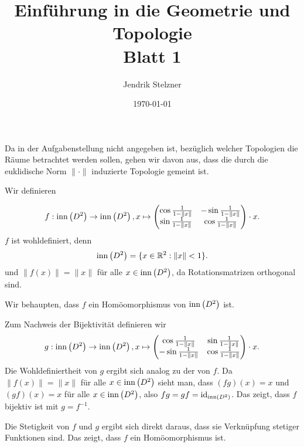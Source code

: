 \documentclass[a4paper,10pt]{article}
\title{\sc Einführung in die Geometrie und Topologie \\ \Large Blatt 1}
\author{Jendrik Stelzner}
\date{\today}
\begin{document}
\maketitle





\section{}
Da in der Aufgabenstellung nicht angegeben ist, bezüglich welcher Topologien die Räume betrachtet werden sollen, gehen wir davon aus, dass die durch die euklidische Norm $\|\cdot\|$ induzierte Topologie gemeint ist.


Wir definieren

\[
 f : \operatorname{inn}\left(D^2\right) \to \operatorname{inn}\left(D^2\right),
 x \mapsto
 \begin{pmatrix}
  \cos \frac{1}{1-\|x\|} & -\sin \frac{1}{1-\|x\|} \\
  \sin \frac{1}{1-\|x\|} & \cos \frac{1}{1-\|x\|}
 \end{pmatrix}
 \cdot x.
\]
$f$ ist wohldefiniert, denn
\[
 \operatorname{inn}\left(D^2\right) = \{x \in \mathbb{R}^2 : \|x\| < 1\}.
\]
und $\|f(x)\| = \|x\|$ für alle $x \in \operatorname{inn}\left(D^2\right)$, da Rotationsmatrizen orthogonal sind.

Wir behaupten, dass $f$ ein Homöomorphismus von $\operatorname{inn}\left(D^2\right)$ ist.

Zum Nachweis der Bijektivität definieren wir
\[
 g : \operatorname{inn}\left(D^2\right) \to \operatorname{inn}\left(D^2\right),
 x \mapsto
 \begin{pmatrix}
  \cos \frac{1}{1-\|x\|} & \sin \frac{1}{1-\|x\|} \\
  -\sin \frac{1}{1-\|x\|} & \cos \frac{1}{1-\|x\|}
 \end{pmatrix}
 \cdot x.
\]
Die Wohldefiniertheit von $g$ ergibt sich analog zu der von $f$. Da $\|f(x)\| = \|x\|$ für alle $x \in \operatorname{inn}\left(D^2\right)$ sieht man, dass $(fg) (x) = x$ und $(gf)(x) = x$ für alle $x \in \operatorname{inn}\left(D^2\right)$, also $fg = gf = \operatorname{id}_{\operatorname{inn}(D^2)}$. Das zeigt, dass $f$ bijektiv ist mit $g = f^{-1}$.

Die Stetigkeit von $f$ und $g$ ergibt sich direkt daraus, dass sie Verknüpfung stetiger Funktionen sind. Das zeigt, dass $f$ ein Homöomorphismus ist.
\end{document}
